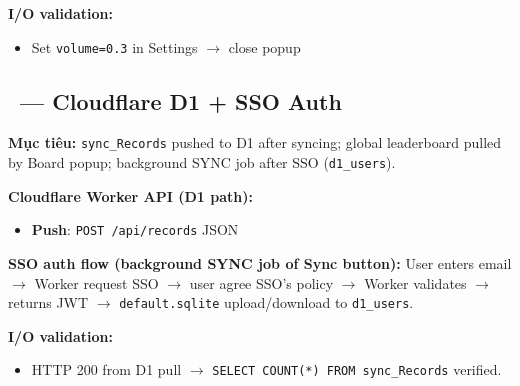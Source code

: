 \documentclass[12pt,a4paper]{article}
\begin{document}
\noindent\textbf{I/O validation:}
\begin{itemize}[nosep]
  \item Set \texttt{volume=0.3} in Settings $\rightarrow$ close popup
\end{itemize}

\subsection{\Vthree\ --- Cloudflare D1 + SSO Auth}

\textbf{Mục tiêu:} \texttt{sync\_Records} pushed to D1 after syncing;
global leaderboard pulled by Board popup; background SYNC job after SSO
(\texttt{d1\_users}).

\noindent\textbf{Cloudflare Worker API (D1 path):}
\begin{itemize}[nosep]
  \item \textbf{Push}: \texttt{POST /api/records} JSON
\end{itemize}

\noindent\textbf{SSO auth flow (background SYNC job of Sync button):}
User enters email $\rightarrow$ Worker request SSO $\rightarrow$ user agree SSO's policy $\rightarrow$ Worker validates $\rightarrow$ returns JWT $\rightarrow$
\texttt{default.sqlite} upload/download to \texttt{d1\_users}.

\noindent\textbf{I/O validation:}
\begin{itemize}[nosep]
  \item HTTP 200 from D1 pull $\rightarrow$ \texttt{SELECT COUNT(*) FROM sync\_Records} verified.
\end{itemize}

\label{LastPageGameConsoleEngineering}
\end{document}
